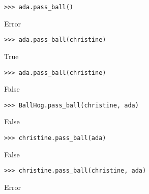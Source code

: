 \begin{blocksection}
\begin{lstlisting}
>>> ada.pass_ball()
\end{lstlisting}
\begin{solution}[.2in]
Error
\end{solution}

\begin{lstlisting}
>>> ada.pass_ball(christine)
\end{lstlisting}
\begin{solution}[.2in]
True
\end{solution}

\begin{lstlisting}
>>> ada.pass_ball(christine)
\end{lstlisting}
\begin{solution}[.2in]
False
\end{solution}

\begin{lstlisting}
>>> BallHog.pass_ball(christine, ada)
\end{lstlisting}
\begin{solution}[.2in]
False
\end{solution}

\begin{lstlisting}
>>> christine.pass_ball(ada)
\end{lstlisting}
\begin{solution}[.2in]
False
\end{solution}

\begin{lstlisting}
>>> christine.pass_ball(christine, ada)
\end{lstlisting}
\begin{solution}[.2in]
Error
\end{solution}
\end{blocksection}
